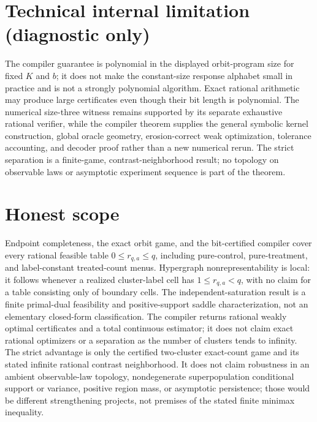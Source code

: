 \documentclass{article}
\begin{document}
\section*{Technical internal limitation (diagnostic only)}

The compiler guarantee is polynomial in the displayed orbit-program size for fixed \(K\) and \(b\); it does not make the constant-size response alphabet small in practice and is not a strongly polynomial algorithm. Exact rational arithmetic may produce large certificates even though their bit length is polynomial. The numerical size-three witness remains supported by its separate exhaustive rational verifier, while the compiler theorem supplies the general symbolic kernel construction, global oracle geometry, erosion-correct weak optimization, tolerance accounting, and decoder proof rather than a new numerical rerun. The strict separation is a finite-game, contrast-neighborhood result; no topology on observable laws or asymptotic experiment sequence is part of the theorem.

\section{Honest scope}

Endpoint completeness, the exact orbit game, and the bit-certified compiler cover every rational feasible table \(0\le r_{q,a}\le q\), including pure-control, pure-treatment, and label-constant treated-count menus. Hypergraph nonrepresentability is local: it follows whenever a realized cluster-label cell has \(1\le r_{q,a}<q\), with no claim for a table consisting only of boundary cells. The independent-saturation result is a finite primal-dual feasibility and positive-support saddle characterization, not an elementary closed-form classification. The compiler returns rational weakly optimal certificates and a total continuous estimator; it does not claim exact rational optimizers or a separation as the number of clusters tends to infinity. The strict advantage is only the certified two-cluster exact-count game and its stated infinite rational contrast neighborhood. It does not claim robustness in an ambient observable-law topology, nondegenerate superpopulation conditional support or variance, positive region mass, or asymptotic persistence; those would be different strengthening projects, not premises of the stated finite minimax inequality.
\end{document}
